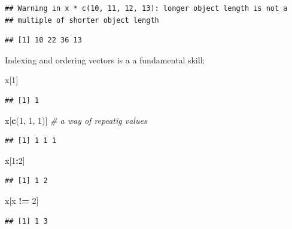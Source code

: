 \documentclass[12pt,]{book}
\newenvironment{Shaded}{\begin{snugshade}}{\end{snugshade}}
\newcommand{\CommentTok}[1]{\textcolor[rgb]{0.56,0.35,0.01}{\textit{#1}}}
\newcommand{\DecValTok}[1]{\textcolor[rgb]{0.00,0.00,0.81}{#1}}
\newcommand{\KeywordTok}[1]{\textcolor[rgb]{0.13,0.29,0.53}{\textbf{#1}}}
\newcommand{\NormalTok}[1]{#1}
\newcommand{\OperatorTok}[1]{\textcolor[rgb]{0.81,0.36,0.00}{\textbf{#1}}}
\newcommand{\StringTok}[1]{\textcolor[rgb]{0.31,0.60,0.02}{#1}}
\begin{document}
\begin{verbatim}
## Warning in x * c(10, 11, 12, 13): longer object length is not a
## multiple of shorter object length
\end{verbatim}

\begin{verbatim}
## [1] 10 22 36 13
\end{verbatim}

Indexing and ordering vectors is a a fundamental skill:

\begin{Shaded}
\begin{Highlighting}[]
\NormalTok{x[}\DecValTok{1}\NormalTok{]}
\end{Highlighting}
\end{Shaded}

\begin{verbatim}
## [1] 1
\end{verbatim}

\begin{Shaded}
\begin{Highlighting}[]
\NormalTok{x[}\KeywordTok{c}\NormalTok{(}\DecValTok{1}\NormalTok{, }\DecValTok{1}\NormalTok{, }\DecValTok{1}\NormalTok{)] }\CommentTok{# a way of repeatig values}
\end{Highlighting}
\end{Shaded}

\begin{verbatim}
## [1] 1 1 1
\end{verbatim}

\begin{Shaded}
\begin{Highlighting}[]
\NormalTok{x[}\DecValTok{1}\OperatorTok{:}\DecValTok{2}\NormalTok{]}
\end{Highlighting}
\end{Shaded}

\begin{verbatim}
## [1] 1 2
\end{verbatim}

\begin{Shaded}
\begin{Highlighting}[]
\NormalTok{x[x }\OperatorTok{!=}\StringTok{ }\DecValTok{2}\NormalTok{]}
\end{Highlighting}
\end{Shaded}

\begin{verbatim}
## [1] 1 3
\end{verbatim}
\end{document}
